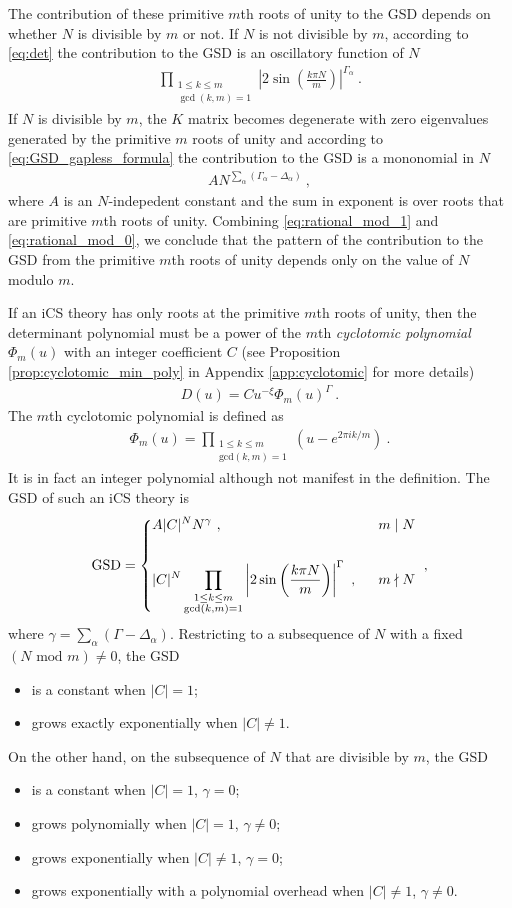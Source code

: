 \documentclass[aps,prb,twocolumn,superscriptaddress,floatfix,10pt,nofootinbib]{revtex4-2}
\newcommand{\ie}{\begin{equation}\begin{aligned}}
\newcommand{\fe}{\end{aligned}\end{equation}}
\theoremstyle{definition}
\begin{document}
The contribution of these primitive $m$th roots of unity to the GSD depends on whether $N$ is divisible by $m$ or not. If $N$ is not divisible by $m$, according to \eqref{eq:det} the contribution to the GSD is an oscillatory function of $N$
\ie\label{eq:rational_mod_1}
\prod_{\substack{1\leq k\leq m\\\gcd(k,m)=1}}\left|2\sin\left(\frac{ k\pi N}{m}\right)\right|^{\Gamma_\alpha}~.
\fe
If $N$ is divisible by $m$, the $K$ matrix becomes degenerate with zero eigenvalues generated by the primitive $m$ roots of unity and according to \eqref{eq:GSD_gapless_formula} the contribution to the GSD is a mononomial in $N$ 
\ie\label{eq:rational_mod_0}
AN^{\sum_\alpha(\Gamma_\alpha-\Delta_\alpha)}~,
\fe
where $A$ is an $N$-indepedent constant and the sum in exponent is over roots that are primitive $m$th roots of unity. Combining \eqref{eq:rational_mod_1} and \eqref{eq:rational_mod_0}, we conclude that the pattern of the contribution to the GSD from the primitive $m$th roots of unity depends only on the value of $N$ modulo $m$.

If an iCS theory has only roots at the primitive $m$th roots of unity, then the determinant polynomial must be a power of the $m$th \emph{cyclotomic polynomial} $\Phi_m(u)$ with an integer coefficient $C$ (see Proposition \ref{prop:cyclotomic_min_poly} in Appendix \ref{app:cyclotomic} for more details)
\ie
D(u)=C u^{-\xi}\Phi_m(u)^{\Gamma}~.
\fe
The $m$th cyclotomic polynomial is defined as
\ie
\Phi_m(u)=\prod_{\substack{1\leq k\leq m\\ \text{gcd}(k,m)=1}}(u-e^{2\pi i k/m})~.
\fe
It is in fact an integer polynomial although not manifest in the definition.
The GSD of such an iCS theory is 
\ie
\text{GSD}=\begin{dcases}
A|C|^N N^{\gamma}~,\ \ &m\mid N
\\
\\
|C|^N\prod_{\substack{1\leq k\leq m\\\gcd(k,m)=1}}\left|2\sin\left(\frac{ k\pi N}{m}\right)\right|^{\Gamma}~,\ \ &m\nmid N 
\end{dcases}~,
\fe
where $\gamma=\sum_\alpha(\Gamma-\Delta_\alpha)$.
Restricting to a subsequence of $N$ with a fixed  $(N\text{ mod }m)\neq 0$, the GSD 
\begin{itemize}[leftmargin=*]
    \item 
    is a constant when $|C|=1$;
    \item
    grows exactly exponentially when $|C|\neq 1$.
\end{itemize}
On the other hand, on the subsequence of $N$ that are divisible by $m$, the GSD 
\begin{itemize}[leftmargin=*]
    \item 
    is a constant when $|C|=1$, $\gamma= 0$;
    \item
    grows polynomially when $|C|= 1$, $\gamma\neq 0$;
    \item 
    grows exponentially when $|C|\neq1$, $\gamma=0$;
    \item 
    grows exponentially with a polynomial overhead when $|C|\neq 1$, $\gamma\neq 0$.
\end{itemize}
\end{document}
